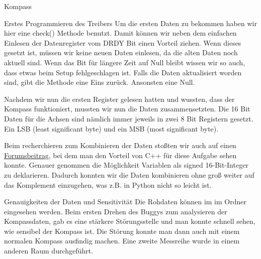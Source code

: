 \documentclass[12pt]{report}
\begin{document}
\begin{section}{Kompass}
\begin{subsection}{Erstes Programmieren des Treibers}
  Um die ersten Daten zu bekommen haben wir hier eine check() Methode benutzt. Damit können wir neben dem
  einfachen Einlesen der Datenregister vom DRDY Bit einen Vorteil ziehen. Wenn dieses gesetzt ist, müssen wir 
  keine neuen Daten einlesen, da die alten Daten noch aktuell sind. Wenn das Bit für längere Zeit auf Null bleibt
  wissen wir so auch, dass etwas beim Setup fehlgeschlagen ist.
  Falls die Daten aktualisiert worden sind, gibt die Methode eine Eins zurück. Ansonsten eine Null. 

  Nachdem wir nun die ersten Register gelesen hatten und wussten, dass der Kompass funktioniert, mussten wir nun die Daten 
  zusammensetzten. Die 16 Bit Daten für die Achsen sind nämlich immer jeweils in zwei 8 Bit Registern gesetzt. Ein 
  LSB (least significant byte) und ein MSB (most significant byte).
  
  Beim recherchieren zum Kombinieren der Daten stoßten wir auch auf einen
  \href{https://forum-raspberrypi.de/forum/thread/39028-qmc5883l-kompass-daten-konvertieren/}{Forumsbeitrag},
  bei dem man den Vorteil von C++ für diese Aufgabe sehen konnte. Genauer genommen die 
  Möglichkeit Variablen als signed 16-Bit-Integer zu deklarieren. Dadurch konnten wir die Daten kombinieren ohne 
  groß weiter auf das Komplement einzugehen, was z.B. in Python nicht so leicht ist.
  \end{subsection}
  \begin{subsection}{Genauigkeiten der Daten und Sensitivität}
  Die Rohdaten können im \githubrepo{} im Ordner  eingesehen werden.
  Beim ersten Drehen des Buggys zum analysieren der Kompassdaten, gab es eine stärkere Störungsstelle und man 
  konnte schnell sehen, wie sensibel der Kompass ist. Die Störung konnte man dann auch mit einem normalen Kompass 
  ausfindig machen.
  Eine zweite Messreihe wurde in einem anderen Raum durchgeführt.


\end{subsection}
\end{section}
\end{document}
